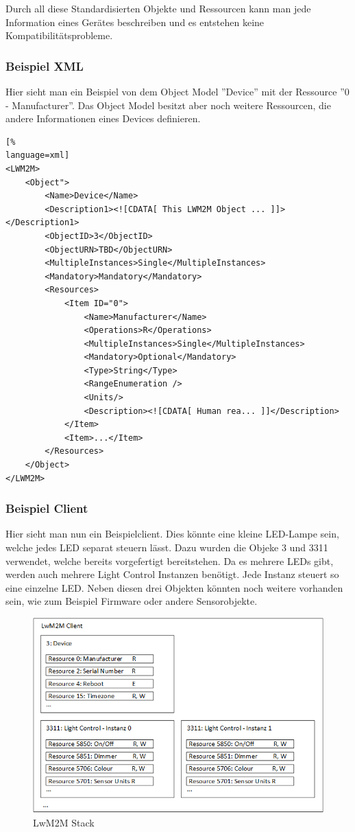 Durch all diese Standardisierten Objekte und Ressourcen kann man jede Information eines Gerätes beschreiben und es entstehen keine Kompatibilitätsprobleme.
\subsubsection{Beispiel XML}
Hier sieht man ein Beispiel von dem Object Model ''Device'' mit der Ressource ''0 - Manufacturer''. Das Object Model besitzt aber noch weitere Ressourcen, die andere Informationen eines Devices definieren.
\begin{lstlisting}[%
language=xml]
<LWM2M>
	<Object">
		<Name>Device</Name>
		<Description1><![CDATA[ This LWM2M Object ... ]]></Description1>
		<ObjectID>3</ObjectID>
		<ObjectURN>TBD</ObjectURN>
		<MultipleInstances>Single</MultipleInstances>
		<Mandatory>Mandatory</Mandatory>
		<Resources>
			<Item ID="0">
				<Name>Manufacturer</Name>
				<Operations>R</Operations>
				<MultipleInstances>Single</MultipleInstances>
				<Mandatory>Optional</Mandatory>
				<Type>String</Type>
				<RangeEnumeration />
				<Units/>
				<Description><![CDATA[ Human rea... ]]</Description>
			</Item>
			<Item>...</Item>
		</Resources>
	</Object>
</LWM2M>
\end{lstlisting}

\subsubsection{Beispiel Client}
Hier sieht man nun ein Beispielclient. Dies könnte eine kleine LED-Lampe sein, welche jedes LED separat steuern lässt. Dazu wurden die Objeke 3 und 3311 verwendet, welche bereits vorgefertigt bereitstehen. Da es mehrere LEDs gibt, werden auch mehrere Light Control Instanzen benötigt. Jede Instanz steuert so eine einzelne LED.
Neben diesen drei Objekten könnten noch weitere vorhanden sein, wie zum Beispiel Firmware oder andere Sensorobjekte.
\begin{figure}[H]
\includegraphics[scale=0.65]{../02_Analyse/images/lwm2m/lwm2m_client.png}
\caption{LwM2M Stack}
\end{figure}

